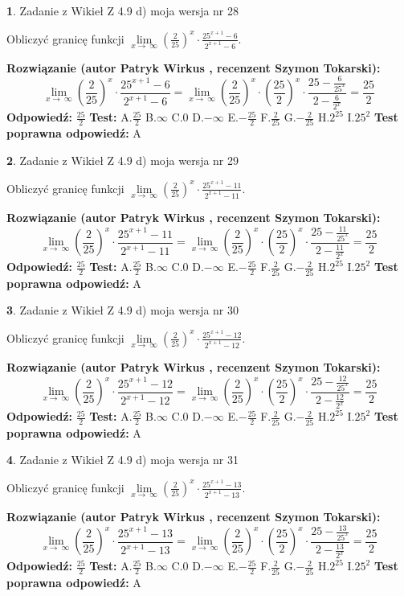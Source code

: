 \documentclass[12pt, a4paper]{article}
\theoremstyle{definition} %
\newtheorem{zad}{}
\newcommand{\zadStart}[1]{\begin{zad}#1\newline}
\newcommand{\zadStop}{\end{zad}}
\newcommand{\rozwStart}[2]{\noindent \textbf{Rozwiązanie (autor #1 , recenzent #2): }\newline}
\newcommand{\rozwStop}{\newline}
\newcommand{\odpStart}{\noindent \textbf{Odpowiedź:}\newline}
\newcommand{\odpStop}{\newline}
\newcommand{\testStart}{\noindent \textbf{Test:}\newline}
\newcommand{\testStop}{\newline}
\newcommand{\kluczStart}{\noindent \textbf{Test poprawna odpowiedź:}\newline}
\newcommand{\kluczStop}{\newline}
\begin{document}
\zadStart{Zadanie z Wikieł Z 4.9 d) moja wersja nr 28}


Obliczyć granicę funkcji  $\lim\limits_{x\to\ \infty}(\frac{2}{25})^{x}\cdot\frac{25^{x+1}-6}{2^{x+1}-6}$.
\zadStop
\rozwStart{Patryk Wirkus}{Szymon Tokarski}
$$\lim\limits_{x\to\ \infty}(\frac{2}{25})^{x}\cdot\frac{25^{x+1}-6}{2^{x+1}-6}=\lim\limits_{x\to\ \infty}(\frac{2}{25})^{x}\cdot(\frac{25}{2})^{x} \cdot \frac{25-\frac{6}{25^{x}}}{2-\frac{6}{2^{x}}} = \frac{25}{2}$$
\rozwStop
\odpStart
$\frac{25}{2}$
\odpStop
\testStart
A.$\frac{25}{2}$ B.$\infty$ C.$0$ D.$-\infty$ E.$-\frac{25}{2}$
F.$\frac{2}{25}$ G.$-\frac{2}{25}$
H.$2^{25}$
I.$25^{2}$
\testStop
\kluczStart
A
\kluczStop



\zadStart{Zadanie z Wikieł Z 4.9 d) moja wersja nr 29}


Obliczyć granicę funkcji  $\lim\limits_{x\to\ \infty}(\frac{2}{25})^{x}\cdot\frac{25^{x+1}-11}{2^{x+1}-11}$.
\zadStop
\rozwStart{Patryk Wirkus}{Szymon Tokarski}
$$\lim\limits_{x\to\ \infty}(\frac{2}{25})^{x}\cdot\frac{25^{x+1}-11}{2^{x+1}-11}=\lim\limits_{x\to\ \infty}(\frac{2}{25})^{x}\cdot(\frac{25}{2})^{x} \cdot \frac{25-\frac{11}{25^{x}}}{2-\frac{11}{2^{x}}} = \frac{25}{2}$$
\rozwStop
\odpStart
$\frac{25}{2}$
\odpStop
\testStart
A.$\frac{25}{2}$ B.$\infty$ C.$0$ D.$-\infty$ E.$-\frac{25}{2}$
F.$\frac{2}{25}$ G.$-\frac{2}{25}$
H.$2^{25}$
I.$25^{2}$
\testStop
\kluczStart
A
\kluczStop



\zadStart{Zadanie z Wikieł Z 4.9 d) moja wersja nr 30}


Obliczyć granicę funkcji  $\lim\limits_{x\to\ \infty}(\frac{2}{25})^{x}\cdot\frac{25^{x+1}-12}{2^{x+1}-12}$.
\zadStop
\rozwStart{Patryk Wirkus}{Szymon Tokarski}
$$\lim\limits_{x\to\ \infty}(\frac{2}{25})^{x}\cdot\frac{25^{x+1}-12}{2^{x+1}-12}=\lim\limits_{x\to\ \infty}(\frac{2}{25})^{x}\cdot(\frac{25}{2})^{x} \cdot \frac{25-\frac{12}{25^{x}}}{2-\frac{12}{2^{x}}} = \frac{25}{2}$$
\rozwStop
\odpStart
$\frac{25}{2}$
\odpStop
\testStart
A.$\frac{25}{2}$ B.$\infty$ C.$0$ D.$-\infty$ E.$-\frac{25}{2}$
F.$\frac{2}{25}$ G.$-\frac{2}{25}$
H.$2^{25}$
I.$25^{2}$
\testStop
\kluczStart
A
\kluczStop



\zadStart{Zadanie z Wikieł Z 4.9 d) moja wersja nr 31}


Obliczyć granicę funkcji  $\lim\limits_{x\to\ \infty}(\frac{2}{25})^{x}\cdot\frac{25^{x+1}-13}{2^{x+1}-13}$.
\zadStop
\rozwStart{Patryk Wirkus}{Szymon Tokarski}
$$\lim\limits_{x\to\ \infty}(\frac{2}{25})^{x}\cdot\frac{25^{x+1}-13}{2^{x+1}-13}=\lim\limits_{x\to\ \infty}(\frac{2}{25})^{x}\cdot(\frac{25}{2})^{x} \cdot \frac{25-\frac{13}{25^{x}}}{2-\frac{13}{2^{x}}} = \frac{25}{2}$$
\rozwStop
\odpStart
$\frac{25}{2}$
\odpStop
\testStart
A.$\frac{25}{2}$ B.$\infty$ C.$0$ D.$-\infty$ E.$-\frac{25}{2}$
F.$\frac{2}{25}$ G.$-\frac{2}{25}$
H.$2^{25}$
I.$25^{2}$
\testStop
\kluczStart
A
\kluczStop
\end{document}
